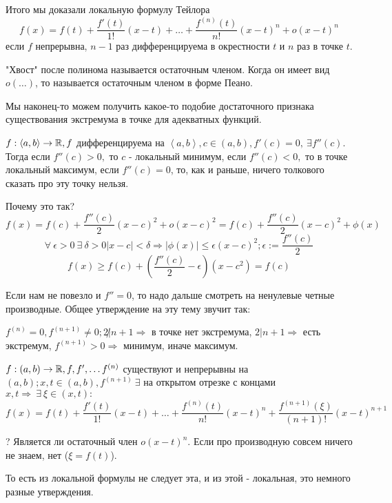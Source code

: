 \documentclass[12pt]{report}
\begin{document}
\begin{cor}
Итого мы доказали локальную формулу Тейлора
$$f(x) = f(t) + \frac{f'(t)}{1!}(x - t) + \dots + \frac{f^{(n)}(t)}{n!}(x - t)^n + o(x - t)^n$$
если $f$ непрерывна, $n - 1$ раз дифференцируема в окрестности $t$ и $n$ раз в точке $t$.

"Хвост" после полинома называется остаточным членом. Когда он имеет вид $o(\dots)$, то называется остаточным членом в форме Пеано.
\end{cor}

\begin{cor}
Мы наконец-то можем получить какое-то подобие достаточного признака существования экстремума в точке для адекватных функций.

$f: \left<a, b\right> \to \mathbb{R}, f$ дифференцируема на $\left<a, b\right>, c \in (a, b), f'(c) = 0, ~\exists f''(c)$. Тогда если $f''(c) > 0, $ то $c$ - локальный минимум, если $f''(c) < 0,$ то в точке локальный максимум, если $f''(c) = 0$, то, как и раньше, ничего толкового сказать про эту точку нельзя.

Почему это так? 
$$f(x) = f(c) + \frac{f''(c)}{2}(x - c)^2 + o(x - c)^2 = f(c) + \frac{f''(c)}{2}(x - c)^2 + \phi(x)$$
$$\forall ~\epsilon > 0 ~\exists ~\delta > 0 |x - c| < \delta \Rightarrow |\phi(x)| \le \epsilon (x - c)^2; \epsilon := \frac{f''(c)}{2}$$
$$f(x) \ge f(c) + \left(\frac{f''(c)}{2} - \epsilon\right)(x - c^2) = f(c)$$

Если нам не повезло и $f'' = 0$, то надо дальше смотреть на ненулевые четные производные. Общее утверждение на эту тему звучит так:
\end{cor}

\begin{st}
$f^{(n)} = 0, f^{(n + 1)} \neq 0; 2 \not| n + 1 \Rightarrow$ в точке нет экстремума, $2 | n + 1 \Rightarrow$ есть экстремум, $f^{(n + 1)} > 0 \Rightarrow$ минимум, иначе максимум.
\end{st}

\begin{thm}
$f: (a, b) \to \mathbb{R}, f, f', \dots f^{(n)}$ существуют и непрерывны на $(a, b); x, t \in (a, b), f^{(n + 1)} ~\exists$ на открытом отрезке с концами $x, t \Rightarrow ~\exists ~\xi \in (x, t):$
$$f(x) = f(t) + \frac{f'(t)}{1!}(x - t) + \dots + \frac{f^{(n)}(t)}{n!}(x - t)^n + \frac{f^{(n + 1)}(\xi)}{(n + 1)!}(x - t)^{n + 1}$$
\end{thm}

\begin{note}
? Является ли остаточный член $o(x - t)^n$. Если про производную совсем ничего не знаем, нет ($\xi = f(t)$).

То есть из локальной формулы не следует эта, и из этой - локальная, это немного разные утверждения.
\end{note}
\end{document}
